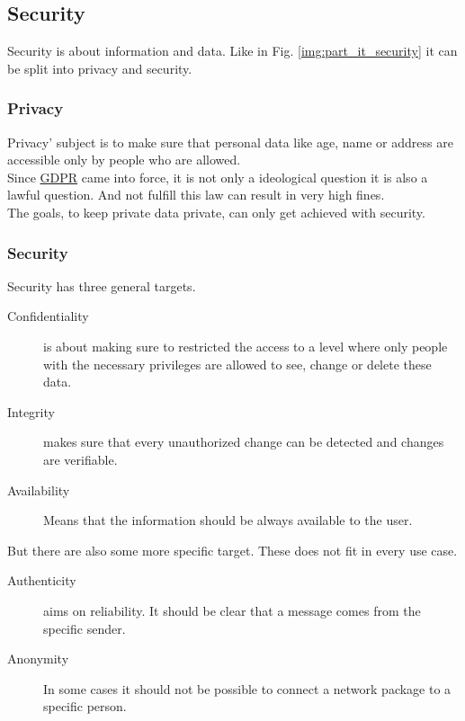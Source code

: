 \subsection{Security}
\label{chp:intro:sec:definition:ssec:safety}

Security is about information and data. Like in Fig. \ref{img:part_it_security} it can be split into privacy and security.

\subsubsection{Privacy}
\label{chp:intro:sec:definition:ssec:safety::sss:privacy}

Privacy' subject is to make sure that personal data like age, name or address are accessible only by people who are allowed. \\
Since \hyperref[https://gdpr-info.eu/]{GDPR} came into force, it is not only a ideological question it is also a lawful question. And not fulfill this law can result in very high fines.\\ The goals, to keep private data private, can only get achieved with security. 

\subsubsection{Security}
\label{chp:intro:sec:definition:ssec:safety::sss:security}

Security has three general targets.

\begin{description}
	\item[Confidentiality] is about making sure to restricted the access to a level where only people with the necessary privileges are allowed to see, change or delete these data.
	
	\item[Integrity] makes sure that every unauthorized change can be detected and changes are verifiable.
	
	\item[Availability] Means that the information should be always available to the user.
\end{description} 

But there are also some more specific target. These does not fit in every use case.

\begin{description}
	\item[Authenticity] aims on reliability. It should be clear that a message comes from the specific sender.
	
	\item[Anonymity] In some cases it should not be possible to connect a network package to a specific person.
\end{description} 

